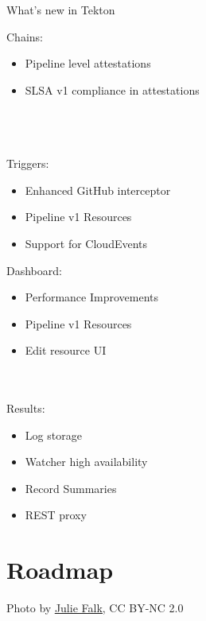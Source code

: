 \documentclass[aspectratio=169,11pt,hyperref={colorlinks=true}]{beamer}
\begin{document}
\begin{2columnsframe}{What's new in Tekton}%
  {%
  Chains:
  \begin{itemize}
    \item Pipeline level attestations
    \item SLSA v1 compliance in attestations
  \end{itemize}
  ~\\
  ~\\
  ~\\
  Triggers:
  \begin{itemize}
    \item Enhanced GitHub interceptor
    \item Pipeline v1 Resources
    \item Support for CloudEvents
  \end{itemize}
  }{%
  Dashboard:
  \begin{itemize}
    \item Performance Improvements
    \item Pipeline v1 Resources
    \item Edit resource UI
  \end{itemize}
  ~\\
  \tiny~\\
  \normalsize
  Results:
  \begin{itemize}
    \item Log storage
    \item Watcher high availability
    \item Record Summaries
    \item REST proxy
  \end{itemize}
  }
\end{2columnsframe}

\section[Roadmap]{Roadmap \faRobot\faCat}
\begin{sectionwithpicrx}{Photo by \href{https://www.flickr.com/photos/piper/}{\underline{Julie Falk}}, CC BY-NC 2.0}
\end{sectionwithpicrx}
\end{document}

